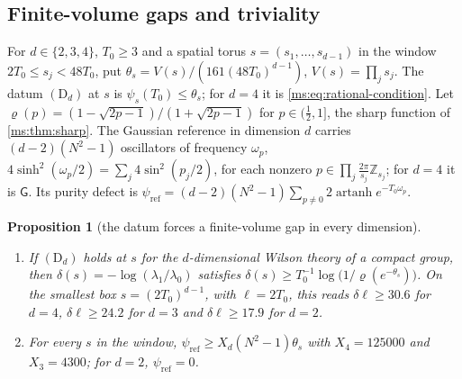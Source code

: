 \documentclass[11pt,a4paper]{amsart}
\newtheorem{proposition}[theorem]{Proposition}
\theoremstyle{definition}
\theoremstyle{remark}
\numberwithin{equation}{section}
\newcommand{\Z}{\mathbb{Z}}          %
\newcommand{\psiT}[2]{\psi_{#1}(#2)}       %
\newcommand{\Vol}[1]{V(#1)}                %
\newcommand{\lzero}{\lambda_0}             %
\newcommand{\Gharm}{\mathsf{G}}            %
\begin{document}
\subsection{Finite-volume gaps and triviality}

For $d\in\{2,3,4\}$, $T_0\ge3$ and a spatial torus $s=(s_1,\dots,s_{d-1})$ in the window $2T_0\le s_j<48T_0$, put $\theta_s=\Vol s/(161(48T_0)^{d-1})$, $\Vol s=\prod_js_j$. The datum $(\mathrm D_d)$ at $s$ is $\psiT{s}{T_0}\le\theta_s$; for $d=4$ it is \cref{ms:eq:rational-condition}. Let $\varrho(p)=(1-\sqrt{2p-1})/(1+\sqrt{2p-1})$ for $p\in(\frac12,1]$, the sharp function of \cref{ms:thm:sharp}. The Gaussian reference in dimension $d$ carries $(d-2)(N^2-1)$ oscillators of frequency $\omega_p$, $4\sinh^2(\omega_p/2)=\sum_j4\sin^2(p_j/2)$, for each nonzero $p\in\prod_j\frac{2\pi}{s_j}\Z_{s_j}$; for $d=4$ it is $\Gharm$. Its purity defect is $\psi_{\mathrm{ref}}=(d-2)(N^2-1)\sum_{p\ne0}2\operatorname{artanh}e^{-T_0\omega_p}$.

\begin{proposition}[the datum forces a finite-volume gap in every dimension]\label{prop:finite-volume-gap}
\leavevmode
\begin{enumerate}[label=\textup{(\alph*)},leftmargin=*]
\item If $(\mathrm D_d)$ holds at $s$ for the $d$-dimensional Wilson theory of a compact group, then $\delta(s)=-\log(\lambda_1/\lzero)$ satisfies $\delta(s)\ge T_0^{-1}\log\bigl(1/\varrho(e^{-\theta_s})\bigr)$. On the smallest box $s=(2T_0)^{d-1}$, with $\ell=2T_0$, this reads $\delta\ell\ge30.6$ for $d=4$, $\delta\ell\ge24.2$ for $d=3$ and $\delta\ell\ge17.9$ for $d=2$.
\item For every $s$ in the window, $\psi_{\mathrm{ref}}\ge X_d(N^2-1)\theta_s$ with $X_4=125000$ and $X_3=4300$; for $d=2$, $\psi_{\mathrm{ref}}=0$.
\end{enumerate}
\end{proposition}
\end{document}
